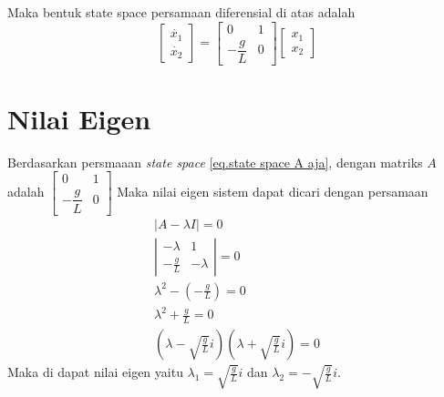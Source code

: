 \documentclass{article}
\begin{document}
Maka bentuk state space persamaan diferensial di atas adalah
\begin{equation}
    \begin{bmatrix}
        \dot{x_1} \\
        \dot{x_2}
    \end{bmatrix}
    = \begin{bmatrix}
        0             & 1 \\
        -\dfrac{g}{L} & 0
    \end{bmatrix}
    \begin{bmatrix}
        x_1 \\
        x_2
    \end{bmatrix} \label{eq.state space A aja}
\end{equation}

\section{Nilai Eigen}
Berdasarkan persmaaan \textit{state space} \eqref{eq.state space A aja}, dengan matriks $A$ adalah
$
    \begin{bmatrix}
        0             & 1 \\
        -\dfrac{g}{L} & 0
    \end{bmatrix}
$
Maka nilai eigen sistem dapat dicari dengan persamaan
\begin{align*}
    |A- \lambda I| = 0                 \\
    \left| \begin{array}{cc}
               -\lambda     & 1        \\
               -\frac{g}{L} & -\lambda
           \end{array} \right| = 0 \\
    {\lambda}^2 - (-\frac{g}{L}) = 0   \\
    {\lambda}^2 +\frac{g}{L} = 0       \\
    \left(\lambda - \sqrt{\frac{g}{L}}i\right)\left(\lambda + \sqrt{\frac{g}{L}}i\right) = 0
\end{align*}
Maka di dapat nilai eigen yaitu  ${\lambda}_1 = \sqrt{\frac{g}{L}}i$ dan ${\lambda}_2 = -\sqrt{\frac{g}{L}}i$.
\end{document}
